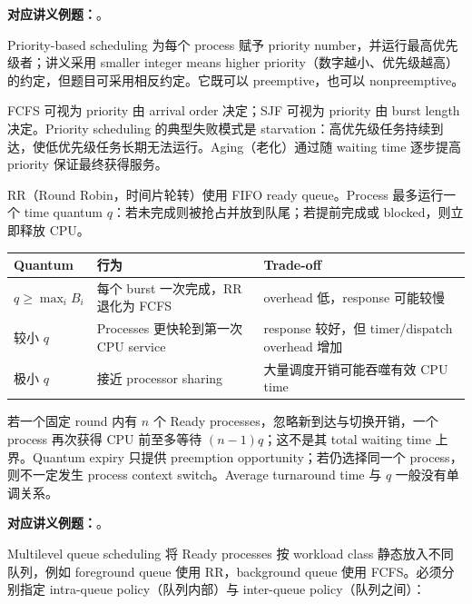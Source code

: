 \textbf{对应讲义例题：}。


Priority-based scheduling 为每个 process 赋予 priority number，并运行最高优先级者；讲义采用 smaller integer means higher priority（数字越小、优先级越高）的约定，但题目可采用相反约定。它既可以 preemptive，也可以 nonpreemptive。

FCFS 可视为 priority 由 arrival order 决定；SJF 可视为 priority 由 burst length 决定。Priority scheduling 的典型失败模式是 starvation：高优先级任务持续到达，使低优先级任务长期无法运行。Aging（老化）通过随 waiting time 逐步提高 priority 保证最终获得服务。


RR（Round Robin，时间片轮转）使用 FIFO ready queue。Process 最多运行一个 time quantum $q$：若未完成则被抢占并放到队尾；若提前完成或 blocked，则立即释放 CPU。

\begin{center}
\small
\begin{tabularx}{0.96\textwidth}{@{}>{\raggedright\arraybackslash}p{2.7cm}XX@{}}
  \toprule
  Quantum & 行为 & Trade-off \\
  \midrule
  $q\ge \max_i B_i$ & 每个 burst 一次完成，RR 退化为 FCFS & overhead 低，response 可能较慢 \\
  较小 $q$ & Processes 更快轮到第一次 CPU service & response 较好，但 timer/dispatch overhead 增加 \\
  极小 $q$ & 接近 processor sharing & 大量调度开销可能吞噬有效 CPU time \\
  \bottomrule
\end{tabularx}
\end{center}

若一个固定 round 内有 $n$ 个 Ready processes，忽略新到达与切换开销，一个 process 再次获得 CPU 前至多等待 $(n-1)q$；这不是其 total waiting time 上界。Quantum expiry 只提供 preemption opportunity；若仍选择同一个 process，则不一定发生 process context switch。Average turnaround time 与 $q$ 一般没有单调关系。

\textbf{对应讲义例题：}。


Multilevel queue scheduling 将 Ready processes 按 workload class 静态放入不同队列，例如 foreground queue 使用 RR，background queue 使用 FCFS。必须分别指定 intra-queue policy（队列内部）与 inter-queue policy（队列之间）：

